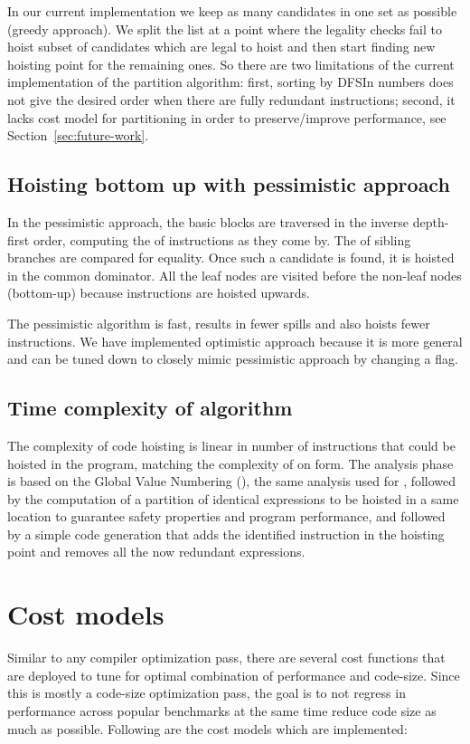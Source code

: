 \documentclass{sig-alternate}
\begin{document}
In our current implementation we keep as many candidates in one set as possible
(greedy approach). We split the list at a point where the legality checks fail
to hoist subset of candidates which are legal to hoist and then start finding
new hoisting point for the remaining ones. So there are two limitations of the
current implementation of the partition algorithm: first, sorting by DFSIn
numbers does not give the desired order when there are fully redundant
instructions; second, it lacks cost model for partitioning in order to
preserve/improve performance, see Section~\ref{sec:future-work}.

\subsection{Hoisting bottom up with pessimistic approach}
\label{subsec:pessimistic}
In the pessimistic approach, the basic blocks are traversed in the inverse
depth-first order, computing the \GVN{} of instructions as they come by. The \GVN{} of
sibling branches are compared for equality. Once such a candidate is found, it
is hoisted in the common dominator. All the leaf nodes are visited before the
non-leaf nodes (bottom-up) because instructions are hoisted upwards.

The pessimistic algorithm is fast, results in fewer spills and also hoists fewer
instructions. We have implemented optimistic approach because it is more general
and can be tuned down to closely mimic pessimistic approach by changing a flag.

\subsection{Time complexity of algorithm}
The complexity of code hoisting is linear in number of instructions that could
be hoisted in the program, matching the complexity of \PRE{} on \SSA{} form.  The
analysis phase is based on the Global Value Numbering (\GVN{}), the same analysis
used for \PRE{}, followed by the computation of a partition of identical
expressions to be hoisted in a same location to guarantee safety properties and
program performance, and followed by a simple code generation that adds the
identified instruction in the hoisting point and removes all the now redundant
expressions.

\section{Cost models}
\label{sec:cost-models}
Similar to any compiler optimization pass, there are several cost functions that
are deployed to tune for optimal combination of performance and code-size.
Since this is mostly a code-size optimization pass, the goal is to not regress
in performance across popular benchmarks at the same time reduce code size as
much as possible. Following are the cost models which are implemented:
\end{document}
